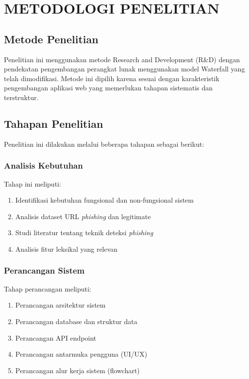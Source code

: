 \chapter{METODOLOGI PENELITIAN}

\section{Metode Penelitian}

Penelitian ini menggunakan metode Research and Development (R\&D) dengan pendekatan pengembangan perangkat lunak menggunakan model Waterfall yang telah dimodifikasi. Metode ini dipilih karena sesuai dengan karakteristik pengembangan aplikasi web yang memerlukan tahapan sistematis dan terstruktur.

\section{Tahapan Penelitian}

Penelitian ini dilakukan melalui beberapa tahapan sebagai berikut:

\subsection{Analisis Kebutuhan}

Tahap ini meliputi:
\begin{enumerate}
    \item Identifikasi kebutuhan fungsional dan non-fungsional sistem
    \item Analisis dataset URL \textit{phishing} dan legitimate
    \item Studi literatur tentang teknik deteksi \textit{phishing}
    \item Analisis fitur leksikal yang relevan
\end{enumerate}

\subsection{Perancangan Sistem}

Tahap perancangan meliputi:
\begin{enumerate}
    \item Perancangan arsitektur sistem
    \item Perancangan database dan struktur data
    \item Perancangan API endpoint
    \item Perancangan antarmuka pengguna (UI/UX)
    \item Perancangan alur kerja sistem (flowchart)
\end{enumerate}

